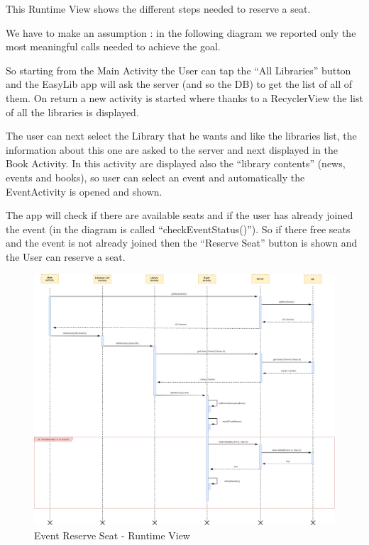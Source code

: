 \newpage
\vspace*{0cm}
This Runtime View shows the different steps needed to reserve a seat. \par
We have to make an assumption : in the following diagram we reported only the most meaningful calls needed to achieve the goal. \par
So starting from the Main Activity the User can tap the “All Libraries” button and the EasyLib app will ask the server (and so the DB) to get the list of all of them. On return a new activity is started where thanks to a RecyclerView the list of all the libraries is displayed. \par
The user can next select the Library that he wants and like the libraries list, the information about this one are asked to the server and next displayed in the Book Activity. In this activity are displayed also the “library contents” (news, events and books), so user can select an event and automatically the EventActivity is opened and shown.\par
The app will check if there are available seats and if the user has already joined the event (in the diagram is called “checkEventStatus()”). So if there free seats and the event is not already joined then the “Reserve Seat” button is shown and the User can reserve a seat.
\newpage
\vspace*{0cm}
\begin{figure}[H]
	\centering
	\includegraphics[scale=0.22]{Images/Runtime/event_reserve_seat}
	\caption{Event Reserve Seat - Runtime View}
\end{figure}


